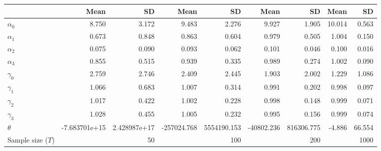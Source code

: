 
\begin{tabular}[t]{lrrrrrrrr}
\toprule
  & Mean & SD & Mean  & SD  & Mean   & SD   & Mean    & SD   \\
\midrule
$\alpha_{0}$ & 8.750 & 3.172 & 9.483 & 2.276 & 9.927 & 1.905 & 10.014 & 0.563\\
$\alpha_{1}$ & 0.673 & 0.848 & 0.863 & 0.604 & 0.979 & 0.505 & 1.004 & 0.150\\
$\alpha_{2}$ & 0.075 & 0.090 & 0.093 & 0.062 & 0.101 & 0.046 & 0.100 & 0.016\\
$\alpha_{3}$ & 0.855 & 0.515 & 0.939 & 0.335 & 0.989 & 0.274 & 1.002 & 0.090\\
$\gamma_{0}$ & 2.759 & 2.746 & 2.409 & 2.445 & 1.903 & 2.002 & 1.229 & 1.086\\
$\gamma_{1}$ & 1.066 & 0.683 & 1.007 & 0.314 & 0.991 & 0.202 & 0.998 & 0.097\\
$\gamma_{2}$ & 1.017 & 0.422 & 1.002 & 0.228 & 0.998 & 0.148 & 0.999 & 0.071\\
$\gamma_{3}$ & 1.028 & 0.455 & 1.005 & 0.232 & 0.995 & 0.156 & 0.999 & 0.074\\
$\theta$ & -7.683701e+15 & 2.428987e+17 & -257024.768 & 5554190.153 & -40802.236 & 816306.775 & -4.886 & 66.554\\
Sample size ($T$) &  & 50 &  & 100 &  & 200 &  & 1000\\
\bottomrule
\end{tabular}
